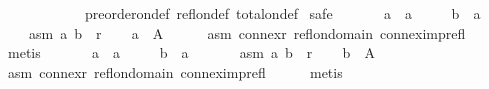\begin{isabellebody}
\ \ \ \ \ \ \ \ \ \ \ \ preorder{\isacharunderscore}{\kern0pt}on{\isacharunderscore}{\kern0pt}def\ refl{\isacharunderscore}{\kern0pt}on{\isacharunderscore}{\kern0pt}def\ total{\isacharunderscore}{\kern0pt}on{\isacharunderscore}{\kern0pt}def\isanewline
{}\isamarkupfalse%
\ {\isacharparenleft}{\kern0pt}safe{\isacharparenright}{\kern0pt}\isanewline
\ \ \isamarkupfalse%
\isanewline
\ \ \ \ a\ {\isacharcolon}{\kern0pt}{\isacharcolon}{\kern0pt}\ {\isachardoublequoteopen}{\isacharprime}{\kern0pt}a{\isachardoublequoteclose}\ \isanewline
\ \ \ \ b\ {\isacharcolon}{\kern0pt}{\isacharcolon}{\kern0pt}\ {\isachardoublequoteopen}{\isacharprime}{\kern0pt}a{\isachardoublequoteclose}\isanewline
\ \ \isamarkupfalse%
\isanewline
\ \ \ \ asm{}{\isacharcolon}{\kern0pt}\ {\isachardoublequoteopen}{\isacharparenleft}{\kern0pt}a{\isacharcomma}{\kern0pt}\ b{\isacharparenright}{\kern0pt}\ {\isasymin}\ r{\isachardoublequoteclose}\isanewline
\ \ \isamarkupfalse%
\ {\isachardoublequoteopen}a\ {\isasymin}\ A{\isachardoublequoteclose}\isanewline
\ \ \ \ \isamarkupfalse%
\ asm{}\ connex{\isacharunderscore}{\kern0pt}r\ refl{\isacharunderscore}{\kern0pt}on{\isacharunderscore}{\kern0pt}domain\ connex{\isacharunderscore}{\kern0pt}imp{\isacharunderscore}{\kern0pt}refl\isanewline
\ \ \ \ \isamarkupfalse%
\ metis\isanewline
{}\isamarkupfalse%
\isanewline
\ \ \isamarkupfalse%
\isanewline
\ \ \ \ a\ {\isacharcolon}{\kern0pt}{\isacharcolon}{\kern0pt}\ {\isachardoublequoteopen}{\isacharprime}{\kern0pt}a{\isachardoublequoteclose}\ \isanewline
\ \ \ \ b\ {\isacharcolon}{\kern0pt}{\isacharcolon}{\kern0pt}\ {\isachardoublequoteopen}{\isacharprime}{\kern0pt}a{\isachardoublequoteclose}\isanewline
\ \ \isamarkupfalse%
\isanewline
\ \ \ \ asm{}{\isacharcolon}{\kern0pt}\ {\isachardoublequoteopen}{\isacharparenleft}{\kern0pt}a{\isacharcomma}{\kern0pt}\ b{\isacharparenright}{\kern0pt}\ {\isasymin}\ r{\isachardoublequoteclose}\isanewline
\ \ \isamarkupfalse%
\ {\isachardoublequoteopen}b\ {\isasymin}\ A{\isachardoublequoteclose}\isanewline
\ \ \ \ \isamarkupfalse%
\ asm{}\ connex{\isacharunderscore}{\kern0pt}r\ refl{\isacharunderscore}{\kern0pt}on{\isacharunderscore}{\kern0pt}domain\ connex{\isacharunderscore}{\kern0pt}imp{\isacharunderscore}{\kern0pt}refl\isanewline
\ \ \ \ \isamarkupfalse%
\ metis\isanewline
{}\isamarkupfalse%

\end{isabellebody}
